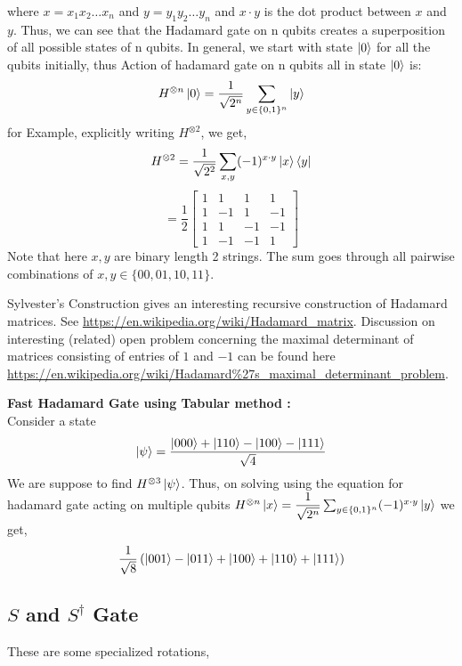 where $x=x_1x_2\ldots x_n$ and $y=y_1y_2\ldots y_n$ and $x\cdot y$ is the dot product between $x$ and $y$. Thus, we can see that the Hadamard gate on n qubits creates a superposition of all possible states of n qubits.
In general, we start with state $\ket{0}$ for all the qubits initially, thus Action of hadamard gate on n qubits all in state $\ket{0}$ is:
\[
    H^{\otimes n}\ket{0}=\dfrac{1}{\sqrt{2^n}}\sum_{y \in \{0,1\}^n}\ket{y}
\]
for Example, explicitly writing $H^{\otimes 2}$, we get,
\[
H^{\otimes 2}=\frac{1}{\sqrt{2^2}}\sum_{x,y}(-1)^{x \cdot y} \ket{x}\bra{y}
\]
\[
=\frac{1}{2} \begin{bmatrix} 1 & 1 & 1 & 1 \\ 1 & -1 & 1 & -1 \\ 1 & 1 & -1 & -1 \\ 1 & -1 & -1 & 1 \end{bmatrix}
\]
Note that here $x,y$ are binary length 2 strings. The sum goes through all pairwise combinations of $x,y \in \{00,01,10,11\}$.
\begin{remark}
    Sylvester's Construction gives an interesting recursive construction of Hadamard matrices. See \href{https://en.wikipedia.org/wiki/Hadamard_matrix}{
https://en.wikipedia.org/wiki/Hadamard\_matrix}. Discussion on interesting (related) open problem concerning the maximal determinant of matrices consisting of entries of $1$ and $-1$ can be found here\\ \href{https://en.wikipedia.org/wiki/Hadamard%27s_maximal_determinant_problem}{https://en.wikipedia.org/wiki/Hadamard\%27s\_maximal\_determinant\_problem}.
\end{remark}
\begin{example}
    \textbf{Fast Hadamard Gate using Tabular method :}\\
    Consider a state 
    \[
    \ket{\psi}=\dfrac{\ket{000}+\ket{110}-\ket{100}-\ket{111}}{\sqrt{4}}
    \]
    We are suppose to find
    $H^{\otimes 3}\ket{\psi}$. Thus, on solving using the equation for hadamard gate acting on multiple qubits $H^{\otimes n}\ket{x}=\dfrac{1}{\sqrt{2^n}}\sum_{y \in \{0,1\}^n}(-1)^{x\cdot y}\ket{y}$ 
    we get,
    \[
        \frac{1}{\sqrt{8}}\left(\ket{001}-\ket{011}+\ket{100}+\ket{110}+\ket{111}\right)
    \]
\end{example}

\subsection{\texorpdfstring{$S$ and $S^{\dagger}$ Gate}{S and S-dagger Gate}}
These are some specialized rotations,

